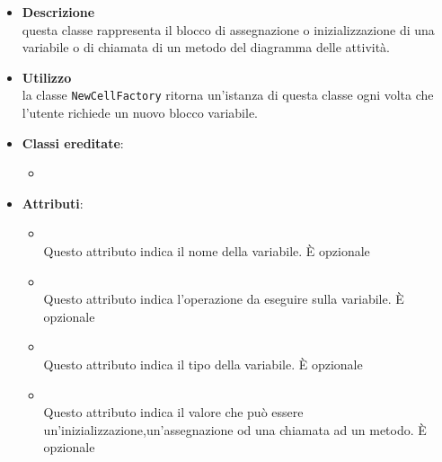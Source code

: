 \label{\nogloxy{swedesigner::client::model::celltypes::activity::HxVariable}}
\begin{itemize}
\item \textbf{Descrizione}\\
questa classe rappresenta il blocco di assegnazione o inizializzazione di una variabile o di chiamata di un metodo del diagramma delle attività.
\item \textbf{Utilizzo}\\
la classe \texttt{NewCellFactory} ritorna un'istanza di questa classe ogni volta che l'utente richiede un nuovo blocco variabile.
\item \textbf{Classi ereditate}:
\begin{itemize}
\item \hyperref[\nogloxy{swedesigner::client::model::celltypes::activity::ActivityDiagramElement}]{}
\end{itemize}
\item \textbf{Attributi}:
\begin{itemize}
\item {}
\\ Questo attributo indica il nome della variabile. È opzionale
\item {}
\\ Questo attributo indica l'operazione da eseguire sulla variabile. È opzionale
\item {}
\\ Questo attributo indica il tipo della variabile. È opzionale
\item {}
\\ Questo attributo indica il valore che può essere un'inizializzazione,un'assegnazione od una chiamata ad un metodo. È opzionale
\end{itemize}
\end{itemize}

